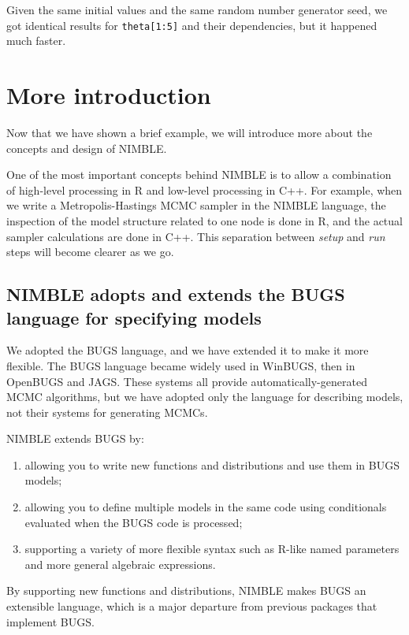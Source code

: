 \documentclass[12pt,oneside]{book}\usepackage[]{graphicx}\usepackage[]{color}
\def\cd#1{\texttt{#1}}
\begin{document}
Given the same initial values and the same random number generator
seed, we got identical results for \cd{theta[1:5]} and their dependencies, but it happened much faster.






\chapter{More introduction}

Now that we have shown a brief example, we will introduce more about
the concepts and design of NIMBLE.  

One of the most important concepts behind NIMBLE is to allow a
combination of high-level processing in R and low-level processing in
C++.  For example, when we write a Metropolis-Hastings MCMC sampler in
the NIMBLE language, the inspection of the model structure related to
one node is done in R, and the actual sampler calculations are done in
C++.  This separation between \textit{setup} and \textit{run} steps
will become clearer as we go.


\section{NIMBLE adopts and extends the BUGS language for specifying models}

We adopted the BUGS language, and we have extended it to make it more
flexible. The BUGS language became widely used in WinBUGS, then in
OpenBUGS and JAGS.  These systems all provide automatically-generated
MCMC algorithms, but we have adopted only the language for describing
models, not their systems for generating MCMCs.  

NIMBLE extends BUGS by:
\begin{enumerate}
\item allowing you to write new functions and
distributions and use them in BUGS models;
\item allowing you to define multiple models in the same code using
  conditionals evaluated when the BUGS code is processed;
\item supporting a variety of more flexible syntax such as R-like
  named parameters and more general algebraic expressions.
\end{enumerate}
By supporting new functions and distributions, NIMBLE makes BUGS an
extensible language, which is a major departure from previous
packages that implement BUGS.  
\end{document}

